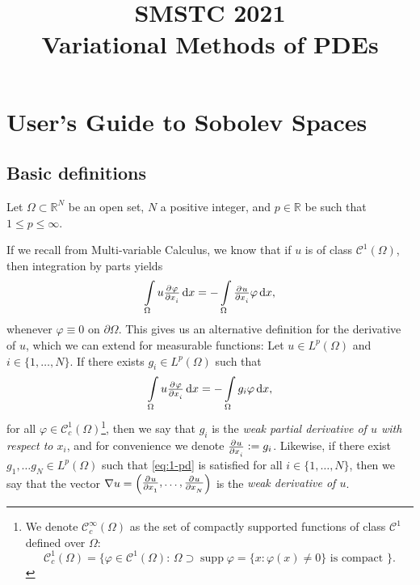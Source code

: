 \documentclass[a4paper,doc,11pt]{article}
\title{\bf
    \Large
    SMSTC 2021 
    \\
    Variational Methods of PDEs
}
\author{}%
\date{}
\newcommand{\R}{\mathbb{R}}
\newcommand{\CC}{\mathcal{C}}
\DeclareMathOperator{\supp}{supp}
\begin{document}
\maketitle






\section{User's Guide to Sobolev Spaces}

\subsection{Basic definitions}

Let \(\Omega \subset \R^N\) be an open set, \(N\) a positive integer, and \(p \in \R\) be such that \( 1\leq p \leq \infty\).

If we recall from Multi-variable Calculus, we know that if \(u\) is of class \( \CC^1(\Omega)\), then integration by parts yields
\[
    \int\limits_\Omega u \pd{\varphi}{x_i} \dif x = -\int\limits_\Omega \pd{u}{x_i} \varphi \dif x,
\]
whenever \( \varphi \equiv 0\) on \(\partial \Omega\). This gives us an alternative definition for the derivative of \(u\), which we can extend for measurable functions: Let \(u \in L^p(\Omega)\) and \(i \in \{1,\ldots,N\}\). If there exists \(g_i \in L^p (\Omega)\) such that
\begin{equation}
    \label{eq:1-pd}
    \int\limits_\Omega u \pd{\varphi}{x_i} \dif x = -\int\limits_\Omega g_i \varphi \dif x,
\end{equation}
for all \(\varphi \in \CC_c^{1} (\Omega)\)\footnote[2]{We denote \(\CC_c^{\infty} (\Omega)\) as the set of compactly supported functions of class \(\CC^1\) defined over \(\Omega\): 
\[
    \CC_c^{1} (\Omega) = \big\{ \varphi \in \CC^1(\Omega): \, \Omega \supset \supp \varphi = \{x: \varphi(x) \neq 0\} \text{ is compact } \big\}.
\]
}, then we say that \(g_i\) is the \emph{weak partial derivative of \(u\) with respect to \(x_i\)}, and for convenience we denote \( \pd{u}{x_i} := g_i \). Likewise, if there exist \( g_1, \ldots g_N \in L^p (\Omega)\) such that \eqref{eq:1-pd} is satisfied for all \( i \in \{1, \ldots, N\}\), then we say that the vector
\(
    \nabla u = 
    \begin{pmatrix}
        \pd{u}{x_1}, \ldots, \pd{u}{x_N}
    \end{pmatrix}
\)
is the \emph{weak derivative of \(u\)}.
\end{document}

